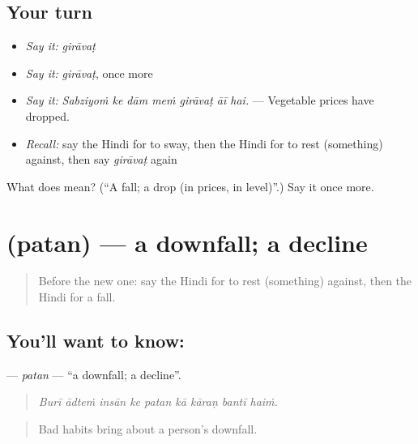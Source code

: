 \subsection*{Your turn}
\begin{itemize}
\raggedright
  \item \emph{Say it:} \emph{girāvaṭ}
  \item \emph{Say it:} \emph{girāvaṭ}, once more
  \item \emph{Say it:} \emph{Sabziyoṁ ke dām meṁ girāvaṭ āī hai.} — Vegetable prices have dropped.
  \item \emph{Recall:} say the Hindi for to sway, then the Hindi for to rest (something) against, then say \emph{girāvaṭ} again
\end{itemize}

\begin{tcolorbox}[breakable,colback=teal!4,colframe=teal!35!black,title={Before you move on}]
What does  mean? (\textquotedblleft{}A fall; a drop (in prices, in level)\textquotedblright{}.) Say it once more.
\end{tcolorbox}
\section[\texorpdfstring{\hi{पतन} (patan)}{पतन (patan)}]{ (patan) — a downfall; a decline}

\label{lesson:HI-C555-patan}



\begin{quote}
Before the new one: say the Hindi for to rest (something) against, then the Hindi for a fall.
\end{quote}

\subsection*{You'll want to know: }
\textbf{} — \emph{patan} — \textquotedblleft{}a downfall; a decline\textquotedblright{}.

\begin{quote}
        
\end{quote}

\begin{quote}
\emph{Burī ādteṁ insān ke patan kā kāraṇ bantī haiṁ.}
\end{quote}

\begin{quote}
Bad habits bring about a person's downfall.
\end{quote}

